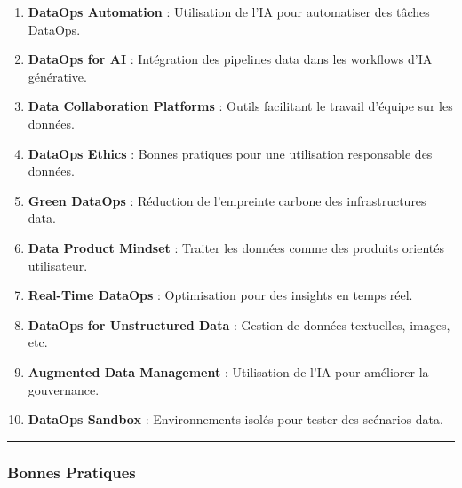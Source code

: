 \documentclass[
  letterpaper,
  DIV=11,
  numbers=noendperiod]{scrartcl}
\providecommand{\tightlist}{%
  \setlength{\itemsep}{0pt}\setlength{\parskip}{0pt}}\usepackage{longtable,booktabs,array}
\begin{document}
\begin{enumerate}
\def\labelenumi{\arabic{enumi}.}
\setcounter{enumi}{80}
\tightlist
\item
  \textbf{DataOps Automation} : Utilisation de l'IA pour automatiser des
  tâches DataOps.\\
\item
  \textbf{DataOps for AI} : Intégration des pipelines data dans les
  workflows d'IA générative.\\
\item
  \textbf{Data Collaboration Platforms} : Outils facilitant le travail
  d'équipe sur les données.\\
\item
  \textbf{DataOps Ethics} : Bonnes pratiques pour une utilisation
  responsable des données.\\
\item
  \textbf{Green DataOps} : Réduction de l'empreinte carbone des
  infrastructures data.\\
\item
  \textbf{Data Product Mindset} : Traiter les données comme des produits
  orientés utilisateur.\\
\item
  \textbf{Real-Time DataOps} : Optimisation pour des insights en temps
  réel.\\
\item
  \textbf{DataOps for Unstructured Data} : Gestion de données
  textuelles, images, etc.\\
\item
  \textbf{Augmented Data Management} : Utilisation de l'IA pour
  améliorer la gouvernance.\\
\item
  \textbf{DataOps Sandbox} : Environnements isolés pour tester des
  scénarios data.
\end{enumerate}

\begin{center}\rule{0.5\linewidth}{0.5pt}\end{center}

\subsubsection{\texorpdfstring{\textbf{Bonnes
Pratiques}}{Bonnes Pratiques}}\label{bonnes-pratiques}
\end{document}

